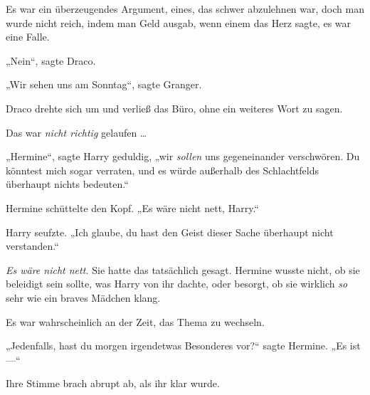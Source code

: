 Es war ein überzeugendes Argument, eines, das schwer abzulehnen war, doch man wurde nicht reich, indem man Geld ausgab, wenn einem das Herz sagte, es war eine Falle.

„Nein“, sagte Draco.

„Wir sehen uns am Sonntag“, sagte Granger.

Draco drehte sich um und verließ das Büro, ohne ein weiteres Wort zu sagen.

Das war \emph{nicht richtig} gelaufen …

\later

„Hermine“, sagte Harry geduldig, „wir \emph{sollen} uns gegeneinander verschwören. Du könntest mich sogar verraten, und es würde außerhalb des Schlachtfelds überhaupt nichts bedeuten.“

Hermine schüttelte den Kopf.
„Es wäre nicht nett, Harry.“

Harry seufzte.
„Ich glaube, du hast den Geist dieser Sache überhaupt nicht verstanden.“

\emph{Es wäre nicht nett.} Sie hatte das tatsächlich gesagt. Hermine wusste nicht, ob sie beleidigt sein sollte, was Harry von ihr dachte, oder besorgt, ob sie wirklich \emph{so} sehr wie ein braves Mädchen klang.

Es war wahrscheinlich an der Zeit, das Thema zu wechseln.

„Jedenfalls, hast du morgen irgendetwas Besonderes vor?“ sagte Hermine.
„Es ist —“

Ihre Stimme brach abrupt ab, als ihr klar wurde.

